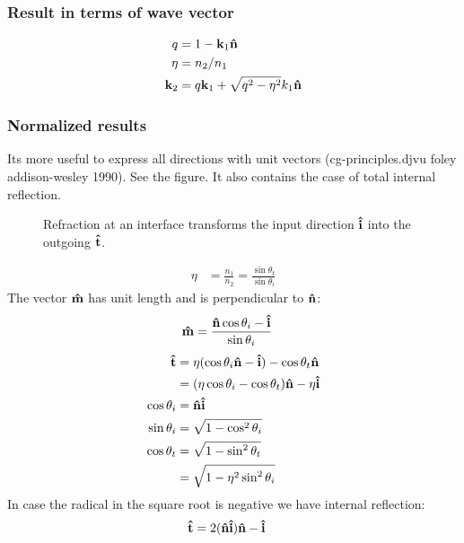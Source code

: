 \documentclass[twocolumn,DIV19]{scrartcl}
\begin{document}
\subsubsection{Result in terms of wave vector}
\begin{align}
  q &= 1-\mathbf{k}_1 \mathbf{\hat{n}}\\
  \eta &= n_2/n_1\\
  \mathbf{k}_2 &= q \mathbf{k}_1 + \sqrt{q^2-\eta^2} k_1\mathbf{\hat{n}}
\end{align}
\subsubsection{Normalized results}
Its more useful to express all directions with unit vectors
(cg-principles.djvu foley addison-wesley 1990). See the figure.
It also contains the case of total internal reflection.
 \begin{figure}
   \centering
   
   \caption{Refraction at an interface transforms the input direction
     $\mathbf{\hat{i}}$ into the outgoing $\mathbf{\hat{t}}$.}
 \end{figure}
 \begin{align}
   \eta&=\frac{n_1}{n_2}=\frac{\sin\theta_t}{\sin\theta_i}
 \end{align}
 The vector $\mathbf{\hat{m}}$ has unit length and is perpendicular to $\mathbf{\hat{n}}$:
 \begin{align}
   \mathbf{\hat{m}}&=\frac{\mathbf{\hat{n}}\cos\theta_i - \mathbf{\hat{i}}}{\sin\theta_i}
 \end{align}
 \begin{align}
   \mathbf{\hat{t}}&=\eta(\cos\theta_i\mathbf{\hat{n}}-\mathbf{\hat{i}})-\cos\theta_t\mathbf{\hat{n}}\\
   &=(\eta\cos\theta_i-\cos\theta_t)\mathbf{\hat{n}}-\eta\mathbf{\hat{i}}\\
   \cos\theta_i&=\mathbf{\hat{n}}\mathbf{\hat{i}}\\
   \sin\theta_i&=\sqrt{1-\cos^2\theta_i}\\
   \cos\theta_t&=\sqrt{1-\sin^2\theta_t}\\
   &=\sqrt{1-\eta^2\sin^2\theta_i}
 \end{align}
 In case the radical in the square root is negative we have internal reflection:
 \begin{align}
   \mathbf{\hat{t}}&=2(\mathbf{\hat{n}}\mathbf{\hat{i}})\mathbf{\hat{n}}-\mathbf{\hat{i}}
 \end{align}
\end{document}
